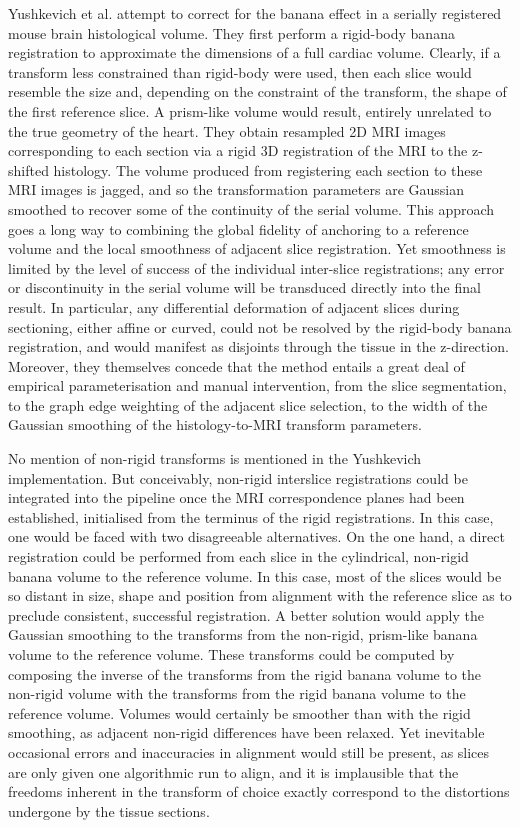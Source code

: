   Yushkevich et al. \cite{Yushkevich2006,Adler2012} attempt to correct for the banana effect in a serially registered mouse brain histological volume. They first perform a rigid-body banana registration to approximate the dimensions of a full cardiac volume. Clearly, if a transform less constrained than rigid-body were used, then each slice would resemble the size and, depending on the constraint of the transform, the shape of the first reference slice. A prism-like volume would result, entirely unrelated to the true geometry of the heart. They obtain resampled 2D MRI images corresponding to each section via a rigid 3D registration of the MRI to the z-shifted histology. The volume produced from registering each section to these MRI images is jagged, and so the transformation parameters are Gaussian smoothed to recover some of the continuity of the serial volume. This approach goes a long way to combining the global fidelity of anchoring to a reference volume and the local smoothness of adjacent slice registration. Yet smoothness is limited by the level of success of the individual inter-slice registrations; any error or discontinuity in the serial volume will be transduced directly into the final result. In particular, any differential deformation of adjacent slices during sectioning, either affine or curved, could not be resolved by the rigid-body banana registration, and would manifest as disjoints through the tissue in the z-direction. Moreover, they themselves concede that the method entails a great deal of empirical parameterisation and manual intervention, from the slice segmentation, to the graph edge weighting of the adjacent slice selection, to the width of the Gaussian smoothing of the histology-to-MRI transform parameters.
  
  No mention of non-rigid transforms is mentioned in the Yushkevich implementation. But conceivably, non-rigid interslice registrations could be integrated into the pipeline once the MRI correspondence planes had been established, initialised from the terminus of the rigid registrations. In this case, one would be faced with two disagreeable alternatives. On the one hand, a direct registration could be performed from each slice in the cylindrical, non-rigid banana volume to the reference volume. In this case, most of the slices would be so distant in size, shape and position from alignment with the reference slice as to preclude consistent, successful registration. A better solution would apply the Gaussian smoothing to the transforms from the non-rigid, prism-like banana volume to the reference volume. These transforms could be computed by composing the inverse of the transforms from the rigid banana volume to the non-rigid volume with the transforms from the rigid banana volume to the reference volume. Volumes would certainly be smoother than with the rigid smoothing, as adjacent non-rigid differences have been relaxed. Yet inevitable occasional errors and inaccuracies in alignment would still be present, as slices are only given one algorithmic run to align, and it is implausible that the freedoms inherent in the transform of choice exactly correspond to the distortions undergone by the tissue sections.
  
